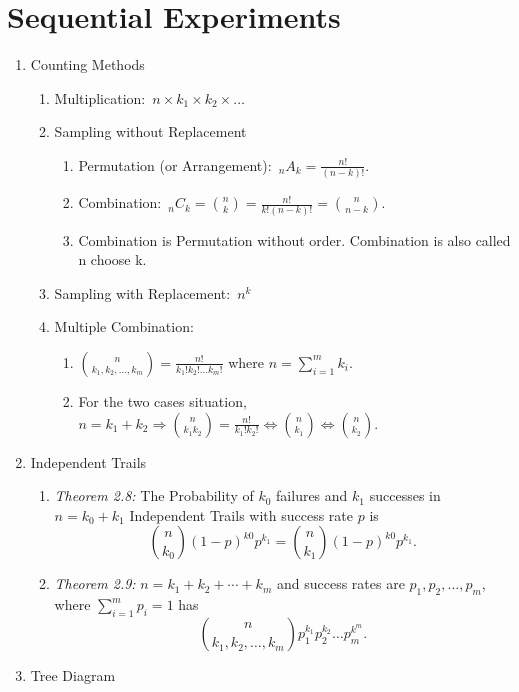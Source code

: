\chapter{Sequential Experiments}
\begin{enumerate}
    \item Counting Methods 
    \begin{enumerate}
        \item Multiplication:~$n\times k_1\times k_2\times \ldots$
        \item Sampling without Replacement
        \begin{enumerate}
            \item Permutation (or Arrangement):~${}_n A_k=\frac{n!}{(n-k)!}$.
            \item Combination:~${}_n C_k=\binom{n}{k}=\frac{n!}{k!(n-k)!}=\binom{n}{n-k}$.
            \item Combination is Permutation without order. Combination is also called n choose k.
        \end{enumerate}
        \item Sampling with Replacement:~$n^k$
        \item Multiple Combination:{
            \begin{enumerate}
                \item $\binom{n}{k_1,k_2,\ldots,k_m}=\frac{n!}{k_1!k_2!\ldots k_m!}$ where $n=\sum_{i=1}^{m}k_i$.
                \item For the two cases situation, $n=k_1+k_2\Rightarrow \binom{n}{k_1k_2}=\frac{n!}{k_1!k_2!}\iff\binom{n}{k_1}\iff\binom{n}{k_2}$.
            \end{enumerate}
            }
    \end{enumerate}
    \item Independent Trails 
    \begin{enumerate}
        \item \textit{Theorem 2.8:} The Probability of $k_0$ failures and $k_1$ successes in $n=k_0+k_1$ Independent Trails with success rate $p$ is \[\binom{n}{k_0}(1-p)^{k0}p^{k_1}=\binom{n}{k_1}(1-p)^{k0}p^{k_1}.\]
        \item \textit{Theorem 2.9:} $n=k_1+k_2+\cdots+k_m$ and success rates are $p_1, p_2,\ldots,p_m$, where $\sum_{i=1}^{m}p_i=1$ has
        \[\binom{n}{k_1,k_2,\ldots,k_m}p_1^{k_1}p_2^{k_2}\ldots p_m^{k^m}.\]
    \end{enumerate}
    \item Tree Diagram
\end{enumerate}